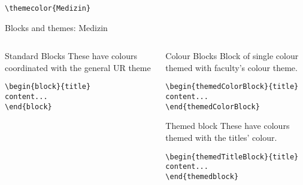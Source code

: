 \begingroup
{}
\begin{center}\verb|\themecolor{Medizin}|\end{center}
\begin{frame}[fragile]{Blocks and themes: Medizin}
\begin{columns} %
\begin{column}{0.3\textwidth}
\begin{block}{Standard Blocks}
These have colours coordinated with the general UR theme
\begin{verbatim}
\begin{block}{title}
content...
\end{block}
\end{verbatim}
\end{block}
\end{column}
\begin{column}{0.7\textwidth}
\begin{themedColorBlock}{Colour Blocks}
Block of single colour themed with faculty's colour theme.
\small
\begin{verbatim}
\begin{themedColorBlock}{title}
content...
\end{themedColorBlock}
\end{verbatim}
\end{themedColorBlock}
\begin{themedTitleBlock} {Themed block}
These have colours themed with the titles' colour.
\small
\begin{verbatim}
\begin{themedTitleBlock}{title}
content...
\end{themedblock}
\end{verbatim}
\end{themedTitleBlock}
\end{column}
\end{columns}
\end{frame}
\endgroup



